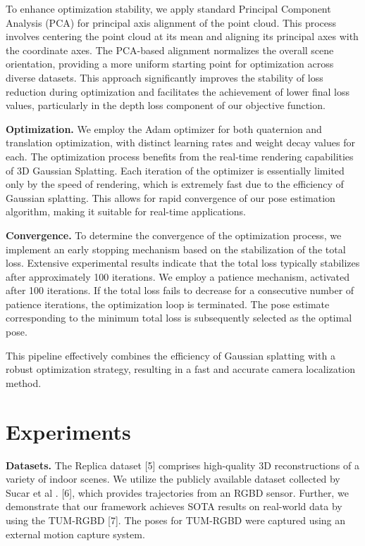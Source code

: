 \documentclass[twocolumn]{article} %
\begin{document}
To enhance optimization stability, we apply standard Principal Component
Analysis (PCA) for principal axis alignment of the point cloud. This
process involves centering the point cloud at its mean and aligning its
principal axes with the coordinate axes. The PCA-based alignment
normalizes the overall scene orientation, providing a more uniform
starting point for optimization across diverse datasets. This approach
significantly improves the stability of loss reduction during
optimization and facilitates the achievement of lower final loss values,
particularly in the depth loss component of our objective function.

\textbf{Optimization.} We employ the Adam optimizer for both quaternion
and translation optimization, with distinct learning rates and weight
decay values for each. The optimization process benefits from the
real-time rendering capabilities of 3D Gaussian Splatting. Each
iteration of the optimizer is essentially limited only by the speed of
rendering, which is extremely fast due to the efficiency of Gaussian
splatting. This allows for rapid convergence of our pose estimation
algorithm, making it suitable for real-time applications.

\textbf{Convergence.} To determine the convergence of the optimization
process, we implement an early stopping mechanism based on the
stabilization of the total loss. Extensive experimental results indicate
that the total loss typically stabilizes after approximately 100
iterations. We employ a patience mechanism, activated after 100
iterations. If the total loss fails to decrease for a consecutive number
of patience iterations, the optimization loop is terminated. The pose
estimate corresponding to the minimum total loss is subsequently
selected as the optimal pose.

This pipeline effectively combines the efficiency of Gaussian splatting
with a robust optimization strategy, resulting in a fast and accurate
camera localization method.

\section{Experiments}\label{experiments}

\textbf{Datasets.} The Replica dataset {[}5{]} comprises high-quality 3D
reconstructions of a variety of indoor scenes. We utilize the publicly
available dataset collected by Sucar et al . {[}6{]}, which provides
trajectories from an RGBD sensor. Further, we demonstrate that our
framework achieves SOTA results on real-world data by using the TUM-RGBD
{[}7{]}. The poses for TUM-RGBD were captured using an external motion
capture system.
\end{document}
